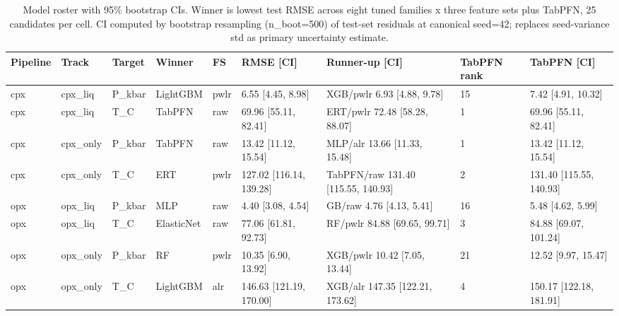 \begin{table}[t]
\centering
\caption{Model roster with 95\% bootstrap CIs. Winner is lowest test RMSE across eight tuned families x three feature sets plus TabPFN, 25 candidates per cell. CI computed by bootstrap resampling (n\_boot=500) of test-set residuals at canonical seed=42; replaces seed-variance std as primary uncertainty estimate.}
\label{tab:T2_model_roster}
\begin{tabular}{lllllllll}
\toprule
Pipeline & Track & Target & Winner & FS & RMSE [CI] & Runner-up [CI] & TabPFN rank & TabPFN [CI] \\
\midrule
cpx & cpx_liq & P_kbar & LightGBM & pwlr & 6.55 [4.45, 8.98] & XGB/pwlr 6.93 [4.88, 9.78] & 15 & 7.42 [4.91, 10.32] \\
cpx & cpx_liq & T_C & TabPFN & raw & 69.96 [55.11, 82.41] & ERT/pwlr 72.48 [58.28, 88.07] & 1 & 69.96 [55.11, 82.41] \\
cpx & cpx_only & P_kbar & TabPFN & raw & 13.42 [11.12, 15.54] & MLP/alr 13.66 [11.33, 15.48] & 1 & 13.42 [11.12, 15.54] \\
cpx & cpx_only & T_C & ERT & pwlr & 127.02 [116.14, 139.28] & TabPFN/raw 131.40 [115.55, 140.93] & 2 & 131.40 [115.55, 140.93] \\
opx & opx_liq & P_kbar & MLP & raw & 4.40 [3.08, 4.54] & GB/raw 4.76 [4.13, 5.41] & 16 & 5.48 [4.62, 5.99] \\
opx & opx_liq & T_C & ElasticNet & raw & 77.06 [61.81, 92.73] & RF/pwlr 84.88 [69.65, 99.71] & 3 & 84.88 [69.07, 101.24] \\
opx & opx_only & P_kbar & RF & pwlr & 10.35 [6.90, 13.92] & XGB/pwlr 10.42 [7.05, 13.44] & 21 & 12.52 [9.97, 15.47] \\
opx & opx_only & T_C & LightGBM & alr & 146.63 [121.19, 170.00] & XGB/alr 147.35 [122.21, 173.62] & 4 & 150.17 [122.18, 181.91] \\
\bottomrule
\end{tabular}
\end{table}
